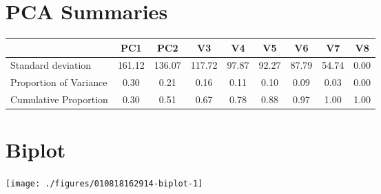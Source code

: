\documentclass[a4paper,11pt]{article}\usepackage[]{graphicx}\usepackage[]{color}
\makeatletter
\def\maxwidth{ %
  \ifdim\Gin@nat@width>\linewidth
    \linewidth
  \else
    \Gin@nat@width
  \fi
}
\newenvironment{knitrout}{}{} %
\makeatother
\begin{document}
\section{PCA Summaries}

\begin{table}[ht]
\begin{flushleft}
\begin{tabular}{lcccccccc}
  \hline
 & PC1 & PC2 & V3 & V4 & V5 & V6 & V7 & V8 \\ 
  \hline
Standard deviation & 161.12 & 136.07 & 117.72 & 97.87 & 92.27 & 87.79 & 54.74 & 0.00 \\ 
  Proportion of Variance & 0.30 & 0.21 & 0.16 & 0.11 & 0.10 & 0.09 & 0.03 & 0.00 \\ 
  Cumulative Proportion & 0.30 & 0.51 & 0.67 & 0.78 & 0.88 & 0.97 & 1.00 & 1.00 \\ 
   \hline
\end{tabular}
\label{importance}
\end{flushleft}
\end{table}


\newpage

\section{Biplot}
\begin{knitrout}
\color{fgcolor}
\texttt{[image: ./figures/010818162914-biplot-1]} 

\end{knitrout}

\end{document}
